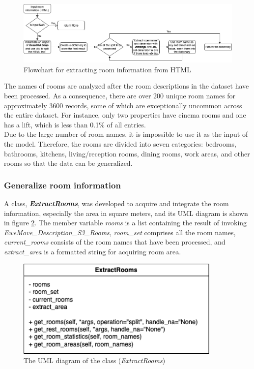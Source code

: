 \documentclass[12pt,twoside]{report}
\begin{document}
\begin{figure}[h]
	\centering
	\includegraphics[width=1\linewidth]{html_room_info}
	\caption{Flowchart for extracting room information from HTML}
	\label{html_room_info}
\end{figure}

The names of rooms are analyzed after the room descriptions in the dataset have been processed. As a consequence, there are over 200 unique room names for approximately 3600 records, some of which are exceptionally uncommon across the entire dataset. For instance, only two properties have cinema rooms and one has a lift, which is less than 0.1\% of all entries.  
\\

Due to the large number of room names, it is impossible to use it as the input of the model. Therefore, the rooms are divided into seven categories: bedrooms, bathrooms, kitchens, living/reception rooms, dining rooms, work areas, and other rooms so that the data can be generalized. 
\\

\subsubsection{Generalize room information}
A class, \textit{\textbf{ExtractRooms}}, was developed to acquire and integrate the room information, especially the area in square meters, and its UML diagram is shown in figure \ref{uml_extract_rooms}. The member variable \textit{rooms} is a list containing the result of invoking \textit{EweMove\_Description\_S3\_Rooms}, \textit{room\_set} comprises all the room names, \textit{current\_rooms} consists of the room names that have been processed, and \textit{extract\_area} is a formatted string for acquiring room area. 
\\

\begin{figure}[h]
	\centering
	\includegraphics[width=10cm]{uml_extract_rooms}
	\caption{The UML diagram of the class (\textit{ExtractRooms})}
	\label{uml_extract_rooms}
\end{figure}
\end{document}
